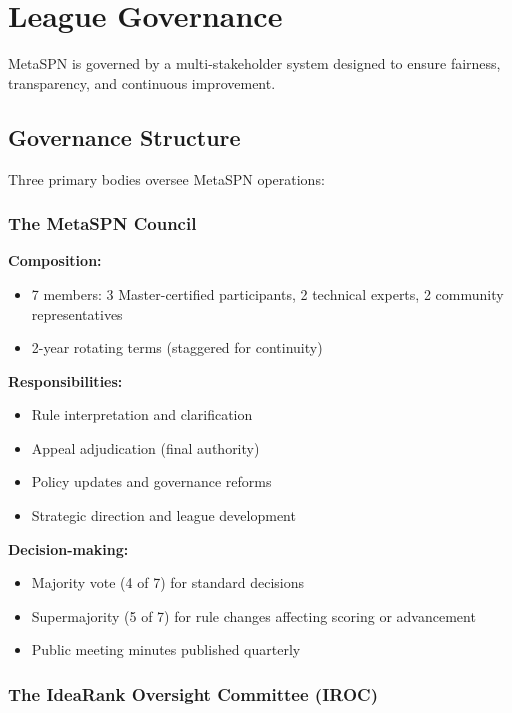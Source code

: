 \chapter{League Governance}
\label{ch:governance}

MetaSPN is governed by a multi-stakeholder system designed to ensure fairness, transparency, and continuous improvement.

\section{Governance Structure}

Three primary bodies oversee MetaSPN operations:

\subsection{The MetaSPN Council}

\textbf{Composition:}
\begin{itemize}[leftmargin=*]
  \item 7 members: 3 Master-certified participants, 2 technical experts, 2 community representatives
  \item 2-year rotating terms (staggered for continuity)
\end{itemize}

\textbf{Responsibilities:}
\begin{itemize}[leftmargin=*]
  \item Rule interpretation and clarification
  \item Appeal adjudication (final authority)
  \item Policy updates and governance reforms
  \item Strategic direction and league development
\end{itemize}

\textbf{Decision-making:}
\begin{itemize}[leftmargin=*]
  \item Majority vote (4 of 7) for standard decisions
  \item Supermajority (5 of 7) for rule changes affecting scoring or advancement
  \item Public meeting minutes published quarterly
\end{itemize}

\subsection{The IdeaRank Oversight Committee (IROC)}

